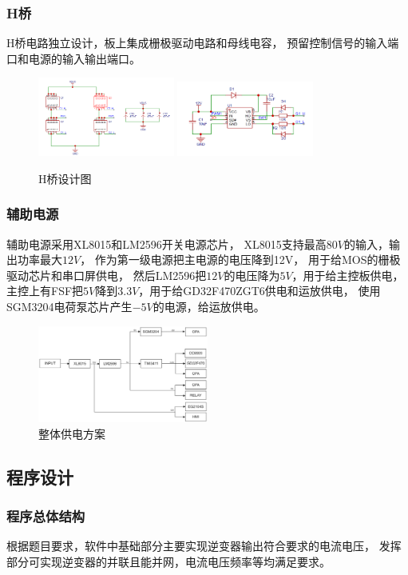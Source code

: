 \documentclass[a4paper,12pt]{article}
\begin{document}
\subsubsection{H桥}
H桥电路独立设计，板上集成栅极驱动电路和母线电容，
预留控制信号的输入端口和电源的输入输出端口。
\begin{figure}[h]
    \centering
    \includegraphics[width=0.4\textwidth]{src/fig6.png}
    \qquad
    \includegraphics[width=0.4\textwidth]{src/fig7.png}
    \caption{H桥设计图}
\end{figure}
\newpage
\subsubsection{辅助电源}
辅助电源采用XL8015和LM2596开关电源芯片，
XL8015支持最高$80V$的输入，输出功率最大$12V$，
作为第一级电源把主电源的电压降到12V，
用于给MOS的栅极驱动芯片和串口屏供电，
然后LM2596把$12V$的电压降为$5V$，用于给主控板供电，
主控上有FSF把$5V$降到$3.3V$，用于给GD32F470ZGT6供电和运放供电，
使用SGM3204电荷泵芯片产生$-5V$的电源，给运放供电。
\begin{figure}[h]
    \centering
    \includegraphics[width=0.5\textwidth]{src/fig2.png}
    \caption{整体供电方案}
    \end{figure}
\subsection{程序设计}

\subsubsection{程序总体结构}
根据题目要求，软件中基础部分主要实现逆变器输出符合要求的电流电压，
发挥部分可实现逆变器的并联且能并网，电流电压频率等均满足要求。
\end{document}
